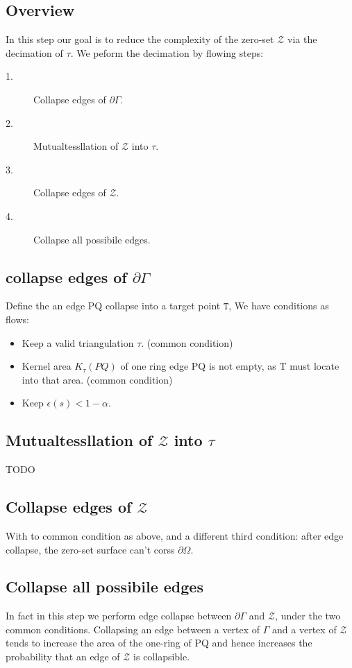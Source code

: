 \documentclass{article}
\theoremstyle{definition}
\theoremstyle{remark}
\begin{document}
\subsection{Overview}
In this step our goal is to reduce the complexity of the zero-set $\mathcal{Z}$ via the decimation of $\tau$. We peform the decimation by flowing steps:
\begin{description}
  \item[1.] Collapse edges of $\partial \Gamma$.
  \item[2.] Mutualtessllation of $\mathcal{Z}$ into $\tau$.
  \item[3.] Collapse edges of $\mathcal{Z}$.
  \item[4.] Collapse all possibile edges.
\end{description}
\subsection{collapse edges of $\partial \Gamma$}
Define the an edge PQ collapse into a target point $\mathtt{T}$, We have conditions as flows:
\begin{itemize}
  \item Keep a valid triangulation $\tau$. (common condition)
  \item Kernel area $K_{\tau}(PQ)$ of one ring edge PQ is not empty, as T must locate into that area. (common condition)
  \item Keep $\epsilon(s) < 1-\alpha$.
\end{itemize}

\subsection{Mutualtessllation of $\mathcal{Z}$ into $\tau$}
TODO
\subsection{Collapse edges of $\mathcal{Z}$}
With to common condition as above, and a different third condition: after edge collapse, the zero-set surface can't corss $\partial \Omega$.
\subsection{Collapse all possibile edges}
In fact in this step we perform edge collapse between $\partial \Gamma$ and $\mathcal{Z}$, under the two common conditions. Collapsing an edge between a vertex of $\Gamma$ and a vertex of $\mathcal{Z}$ tends to increase the area of the one-ring of PQ  and hence increases the probability that an edge of $\mathcal{Z}$ is collapsible.
\end{document}
